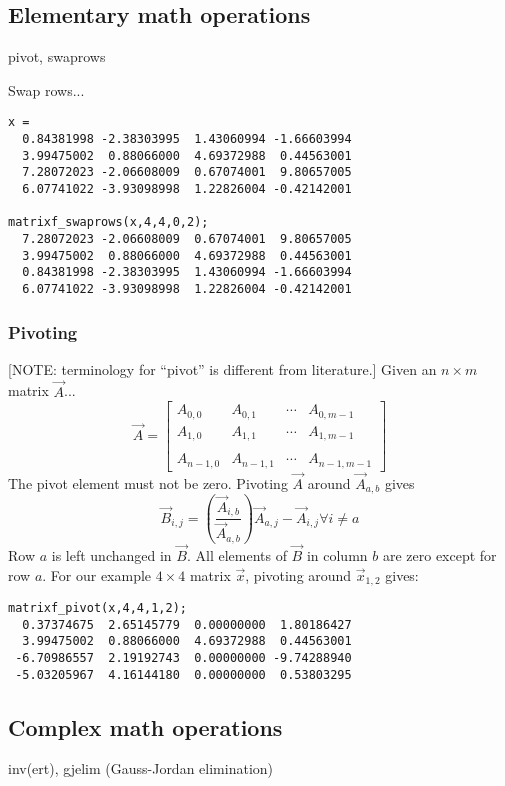 \subsection{Elementary math operations}
\label{module:matrix:elementary}
pivot, swaprows

Swap rows...
\begin{verbatim}
x = 
  0.84381998 -2.38303995  1.43060994 -1.66603994
  3.99475002  0.88066000  4.69372988  0.44563001
  7.28072023 -2.06608009  0.67074001  9.80657005
  6.07741022 -3.93098998  1.22826004 -0.42142001

matrixf_swaprows(x,4,4,0,2);
  7.28072023 -2.06608009  0.67074001  9.80657005
  3.99475002  0.88066000  4.69372988  0.44563001
  0.84381998 -2.38303995  1.43060994 -1.66603994
  6.07741022 -3.93098998  1.22826004 -0.42142001
\end{verbatim}

\subsubsection{Pivoting}
[NOTE: terminology for ``pivot'' is different from literature.]
Given an $n \times m$ matrix $\vec{A}$...
\[
    \vec{A} = 
    \begin{bmatrix}
        A_{0,0}     & A_{0,1}   & \cdots  & A_{0,m-1} \\
        A_{1,0}     & A_{1,1}   & \cdots  & A_{1,m-1} \\
        \\
        A_{n-1,0}   & A_{n-1,1} & \cdots  & A_{n-1,m-1}
    \end{bmatrix}
\]
The pivot element must not be zero.
Pivoting $\vec{A}$ around $\vec{A}_{a,b}$ gives
\[
    \vec{B}_{i,j} = \left(
                    \frac{\vec{A}_{i,b}}{\vec{A}_{a,b}}
                    \right)
                    \vec{A}_{a,j} - \vec{A}_{i,j}
                    \forall i \ne a
\]
Row $a$ is left unchanged in $\vec{B}$.
All elements of $\vec{B}$ in column $b$ are zero except for row $a$.
For our example $4 \times 4$ matrix $\vec{x}$, pivoting around
$\vec{x}_{1,2}$ gives:
\begin{verbatim}
matrixf_pivot(x,4,4,1,2);
  0.37374675  2.65145779  0.00000000  1.80186427
  3.99475002  0.88066000  4.69372988  0.44563001
 -6.70986557  2.19192743  0.00000000 -9.74288940
 -5.03205967  4.16144180  0.00000000  0.53803295
\end{verbatim}

\subsection{Complex math operations}
\label{module:matrix:complex}
inv(ert), gjelim (Gauss-Jordan elimination)

